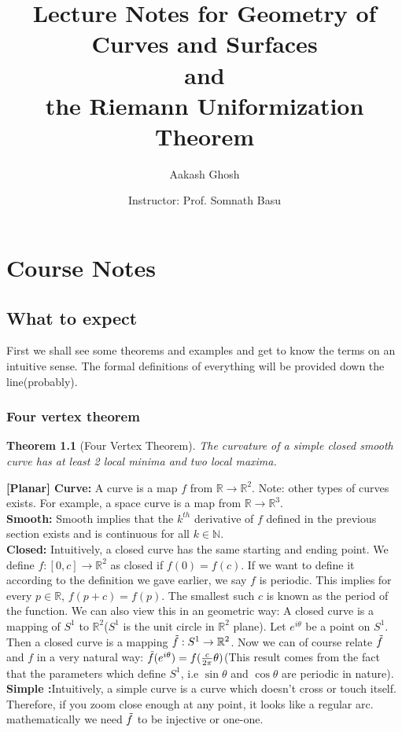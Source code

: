 \documentclass[oneside]{book}\twocolumn
\title{Lecture Notes for Geometry of Curves and Surfaces\\ and \\the Riemann Uniformization Theorem}
\author{Aakash Ghosh }
\date{Instructor: Prof. Somnath Basu}
\newtheorem{theorem}{Theorem}
\begin{document}
\maketitle
\tableofcontents

\part{Course Notes}
\chapter{What to expect}
First we shall see some theorems and examples and get to know the terms on an intuitive sense. The formal definitions of everything will be provided down the line(probably).
\section{Four vertex theorem}
\begin{theorem}[Four Vertex Theorem]
The curvature of a simple closed smooth curve has at least 2 local minima and two local maxima.
\end{theorem}
\textbf{[Planar] Curve:} A curve is a map $f$ from $\mathbb R\to\mathbb R^2$. Note: other types of curves exists. For example, a space curve is a map from $\mathbb R\to\mathbb R^3$.\\
\textbf{Smooth:} Smooth implies that the $k^{th}$ derivative of $f$ defined in the previous section exists and is continuous for all $k\in\mathbb N$.\\
\textbf{Closed:} Intuitively, a closed curve has the same starting and ending point. We define $f:[0,c]\to\mathbb R^2$ as closed if $f(0)=f(c)$. If we want to define it according to the definition we gave earlier, we say $f$ is periodic. This implies for every $p\in\mathbb R$, $f(p+c)=f(p)$. The smallest such $c$ is known as the period of the function. We can also view this in an geometric way: A closed curve is a mapping of $S^1$ to $\mathbb R^2$($S^1$ is the unit circle in $\mathbb R^2$ plane). Let $e^{i\theta}$ be a point on $S^1$. Then a closed curve is a mapping $\Tilde{f}:S^1\to \mathbb{R}^2$. Now we can of course relate $\Tilde{f}$ and $f$ in a very natural way: $\Tilde{f}(e^{i\theta})=f(\frac{c}{2\pi}\theta)$(This result comes from the fact that the parameters which define $S^1$, i.e $\sin\theta$ and $\cos\theta$ are periodic in nature).\\
\textbf{Simple :}Intuitively, a simple curve is a curve which doesn't cross or touch itself. Therefore, if you zoom close enough at any point, it looks like a regular arc. mathematically we need $\Tilde{f}$ to be injective or one-one.
\end{document}
